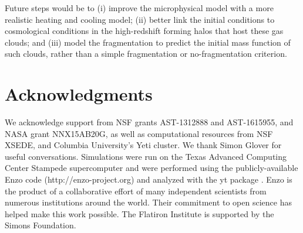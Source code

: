 \documentclass[useAMS,usenatbib]{mn2e}
\begin{document}
Future steps would be to (i) improve the microphysical model with a more realistic heating and cooling model; (ii) better link the initial conditions to cosmological conditions in the high-redshift forming halos that host these gas clouds; and (iii) model the fragmentation to predict the initial mass function of such clouds, rather than a simple fragmentation or no-fragmentation criterion.

% 
\section*{Acknowledgments}

We acknowledge support from NSF grants AST-1312888 and AST-1615955, and NASA grant NNX15AB20G, as well as computational resources from NSF XSEDE,
and Columbia University's Yeti cluster.  We thank Simon Glover for useful conversations.  Simulations were run on the Texas Advanced Computing Center Stampede supercomputer and were performed
using the publicly-available Enzo code (http://enzo-project.org) and analyzed with the yt package \citep{Turk2011}. Enzo is the product of a
collaborative effort of many independent scientists from numerous institutions around the world. Their commitment to open science has helped make
this work possible. The Flatiron Institute is supported by the Simons Foundation. 


%
\end{document}
